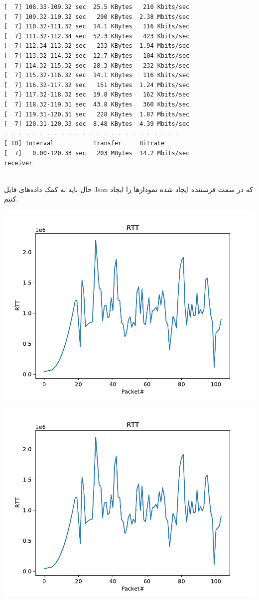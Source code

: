 \documentclass[12pt]{article}
\begin{document}
\begin{enumerate}
\begin{latin}
\begin{Verbatim}
[  7] 108.33-109.32 sec  25.5 KBytes   210 Kbits/sec                  
[  7] 109.32-110.32 sec   290 KBytes  2.38 Mbits/sec                  
[  7] 110.32-111.32 sec  14.1 KBytes   116 Kbits/sec                  
[  7] 111.32-112.34 sec  52.3 KBytes   423 Kbits/sec                  
[  7] 112.34-113.32 sec   233 KBytes  1.94 Mbits/sec                  
[  7] 113.32-114.32 sec  12.7 KBytes   104 Kbits/sec                  
[  7] 114.32-115.32 sec  28.3 KBytes   232 Kbits/sec                  
[  7] 115.32-116.32 sec  14.1 KBytes   116 Kbits/sec                  
[  7] 116.32-117.32 sec   151 KBytes  1.24 Mbits/sec                  
[  7] 117.32-118.32 sec  19.8 KBytes   162 Kbits/sec                  
[  7] 118.32-119.31 sec  43.8 KBytes   360 Kbits/sec                  
[  7] 119.31-120.31 sec   228 KBytes  1.87 Mbits/sec                  
[  7] 120.31-120.33 sec  8.48 KBytes  4.39 Mbits/sec                  
- - - - - - - - - - - - - - - - - - - - - - - - -
[ ID] Interval           Transfer     Bitrate
[  7]   0.00-120.33 sec   203 MBytes  14.2 Mbits/sec                  receiver


		\end{Verbatim}
	\end{latin}
	
	حال باید به کمک داده‌های فایل Json که در سمت فرستنده ایجاد شده نمودارها را ایجاد کنیم.
	
	\begin{center}
		\includegraphics[page=1, width = 0.6 \textwidth]{images/plots.pdf}
	\end{center}
	
	\begin{center}
		\includegraphics[page=2, width = 0.6 \textwidth]{images/plots.pdf}
	\end{center}
	

\end{enumerate}
\end{document}
